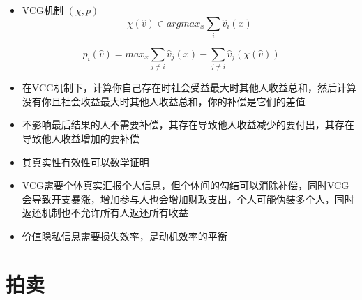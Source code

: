 \documentclass[]{book}
\providecommand{\tightlist}{%
  \setlength{\itemsep}{0pt}\setlength{\parskip}{0pt}}
\begin{document}
\begin{itemize}
\tightlist
\item
  VCG机制 \((\chi,p)\)
  \[\chi (\hat v) \in arg max_x \sum_i \hat v_i(x)\]
\end{itemize}

\[p_i(\hat v) = max_x\sum_{j\neq i} \hat v_j(x) - \sum_{j\neq i} \hat v_j(\chi(\hat v))\]

\begin{itemize}
\tightlist
\item
  在VCG机制下，计算你自己存在时社会受益最大时其他人收益总和，然后计算没有你且社会收益最大时其他人收益总和，你的补偿是它们的差值
\item
  不影响最后结果的人不需要补偿，其存在导致他人收益减少的要付出，其存在导致他人收益增加的要补偿
\item
  其真实性有效性可以数学证明
\item
  VCG需要个体真实汇报个人信息，但个体间的勾结可以消除补偿，同时VCG会导致开支暴涨，增加参与人也会增加财政支出，个人可能伪装多个人，同时返还机制也不允许所有人返还所有收益
\item
  价值隐私信息需要损失效率，是动机效率的平衡
\end{itemize}

\hypertarget{ux62cdux5356}{%
\section{拍卖}\label{ux62cdux5356}}
\end{document}
